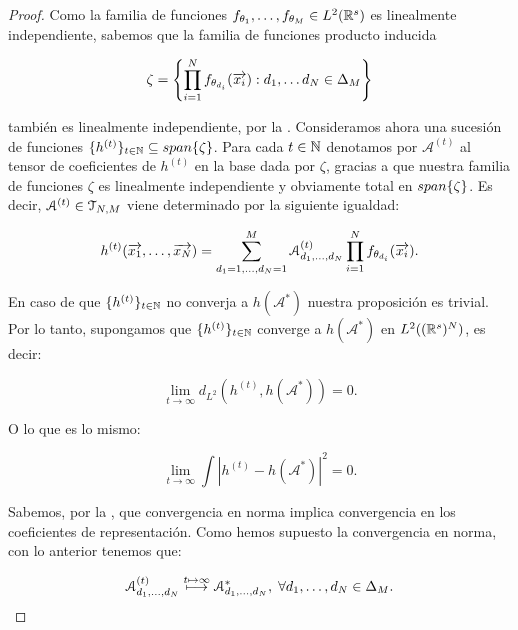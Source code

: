\begin{proof}
    Como la familia de funciones $f_{\theta_1}, \ldots, f_{\theta_M} \in L^2(\mathbb{R}^s)$ es linealmente independiente, sabemos que la familia de funciones producto inducida

    \begin{equation}
        \zeta = \left \{ \prod_{i = 1}^N f_{\theta_{d_i}}(\overrightarrow{x_i}): d_1, \ldots d_N \in \Delta_{M} \right\}
    \end{equation}

    también es linealmente independiente, por la . Consideramos ahora una sucesión de funciones $\{ h^{(t)} \}_{t \in \mathbb{N}} \subseteq span\{ \zeta \}$. Para cada $t \in \mathbb{N}$ denotamos por $\mathcal{A}^{(t)}$ al tensor de coeficientes de $h^{(t)}$ en la base dada por $\zeta$, gracias a que nuestra familia de funciones $\zeta$ es linealmente independiente y obviamente total en $span \{ \zeta \}$. Es decir, $\mathcal{A}^{(t)} \in \mathcal{T}_{N, M}$ viene determinado por la siguiente igualdad:

    \begin{equation}
        h^{(t)}(\overrightarrow{x_1}, \ldots, \overrightarrow{x_N}) = \sum_{d_1 = 1, \ldots, d_N = 1}^M \mathcal{A}^{(t)}_{d_1, \ldots, d_N} \prod_{i = 1}^N f_{\theta_{d_i}}(\overrightarrow{x_i}).
    \end{equation}

    En caso de que $\{ h^{(t)} \}_{t \in \mathbb{N}}$ no converja a $h(\mathcal{A}^*)$ nuestra proposición es trivial. Por lo tanto, supongamos que $\{ h^{(t)} \}_{t \in \mathbb{N}}$ converge a $h(\mathcal{A}^*)$ en $L^2((\mathbb{R}^s)^N)$, es decir:

    \begin{equation}
        \lim_{t \to \infty} d_{L^2}(h^{(t)}, h(\mathcal{A}^*)) = 0.
    \end{equation}

    O lo que es lo mismo:

    \begin{equation}
        \lim_{t \to \infty} \int | h^{(t)} - h(\mathcal{A}^*)|^2 = 0.
    \end{equation}

    Sabemos, por la , que convergencia en norma implica convergencia en los coeficientes de representación. Como hemos supuesto la convergencia en norma, con lo anterior tenemos que:

    \begin{equation}
        \mathcal{A}^{(t)}_{d_1, \ldots, d_N} \stackrel{t \mapsto \infty}{\longmapsto} \mathcal{A}^*_{d_1, \ldots, d_N},
        \; \forall d_1, \ldots, d_N \in \Delta_{M}.
    \end{equation}


\end{proof}
